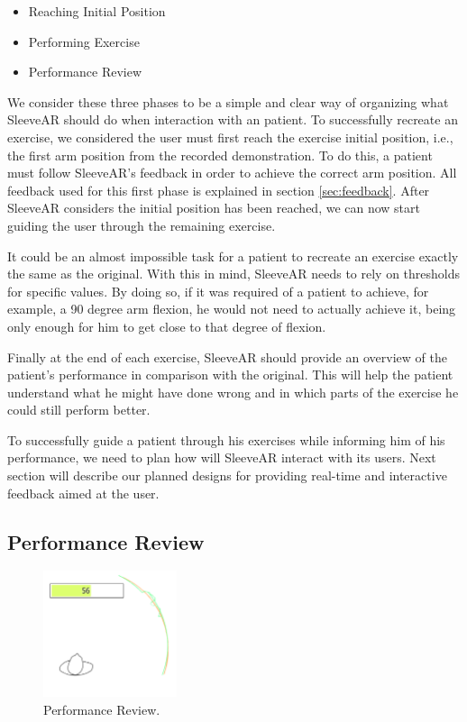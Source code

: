 \begin{itemize}
\item Reaching Initial Position
\item Performing Exercise
\item Performance Review
\end{itemize}

We consider these three phases to be a simple and clear way of organizing what SleeveAR should do when interaction with an patient.
To successfully recreate an exercise, we considered the user must first reach the exercise initial position, i.e., the first arm position from the recorded demonstration.
To do this, a patient must follow SleeveAR's feedback in order to achieve the correct arm position. 
All feedback used for this first phase is explained in section \ref{sec:feedback}.
After SleeveAR considers the initial position has been reached, we can now start guiding the user through the remaining exercise.

It could be an almost impossible task for a patient to recreate an exercise exactly the same as the original. 
With this in mind, SleeveAR needs to rely on thresholds for specific values. 
By doing so, if it was required of a patient to achieve, for example, a 90 degree arm flexion, he would not 
need to actually achieve it, being only enough for him to get close to that degree of flexion.

Finally at the end of each exercise, SleeveAR should provide an overview of the patient's performance in comparison with the original. 
This will help the patient understand what he might have done wrong and in which parts of the exercise he could still perform better.

To successfully guide a patient through his exercises while informing him of his performance, we need to plan how will SleeveAR interact with its users. 
Next section will describe our planned designs for providing real-time and interactive feedback aimed at the user.


\subsection{Performance Review}

\begin{figure}
    \begin{center}
        \includegraphics[width=0.35\textwidth]{imgs/approach/performancereview}
    \end{center}
    \caption{Performance Review.}
    \label{fig:performancereview}
\end{figure}

